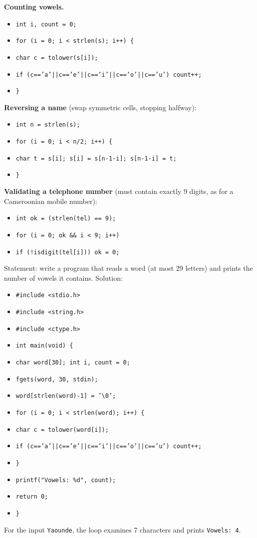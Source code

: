 \documentclass[11pt]{article}
\begin{document}
\textbf{Counting vowels.}
\begin{itemize}
\item \texttt{int i, count = 0;}
\item \texttt{for (i = 0; i < strlen(s); i++) \{}
\item \texttt{\quad char c = tolower(s[i]);}
\item \texttt{\quad if (c=='a'||c=='e'||c=='i'||c=='o'||c=='u') count++;}
\item \texttt{\}}
\end{itemize}

\textbf{Reversing a name} (swap symmetric cells, stopping halfway):
\begin{itemize}
\item \texttt{int n = strlen(s);}
\item \texttt{for (i = 0; i < n/2; i++) \{}
\item \texttt{\quad char t = s[i]; s[i] = s[n-1-i]; s[n-1-i] = t;}
\item \texttt{\}}
\end{itemize}

\textbf{Validating a telephone number} (must contain exactly 9 digits, as for a Cameroonian mobile number):
\begin{itemize}
\item \texttt{int ok = (strlen(tel) == 9);}
\item \texttt{for (i = 0; ok \&\& i < 9; i++)}
\item \texttt{\quad if (!isdigit(tel[i])) ok = 0;}
\end{itemize}

\begin{exoresolu}
Statement: write a program that reads a word (at most 29 letters) and prints the number of vowels it contains.
\tcblower
Solution:
\begin{itemize}
\item \texttt{\#include <stdio.h>}
\item \texttt{\#include <string.h>}
\item \texttt{\#include <ctype.h>}
\item \texttt{int main(void) \{}
\item \texttt{\quad char word[30]; int i, count = 0;}
\item \texttt{\quad fgets(word, 30, stdin);}
\item \texttt{\quad word[strlen(word)-1] = '\textbackslash 0';}
\item \texttt{\quad for (i = 0; i < strlen(word); i++) \{}
\item \texttt{\quad\quad char c = tolower(word[i]);}
\item \texttt{\quad\quad if (c=='a'||c=='e'||c=='i'||c=='o'||c=='u') count++;}
\item \texttt{\quad \}}
\item \texttt{\quad printf("Vowels: \%d", count);}
\item \texttt{\quad return 0;}
\item \texttt{\}}
\end{itemize}
For the input \texttt{Yaounde}, the loop examines 7 characters and prints \texttt{Vowels: 4}.
\end{exoresolu}
\end{document}
